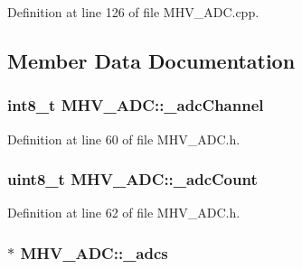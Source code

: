 \-Definition at line 126 of file \-M\-H\-V\-\_\-\-A\-D\-C.\-cpp.



\subsection{\-Member \-Data \-Documentation}
\hypertarget{class_m_h_v___a_d_c_ac37e4bbff5ab56cf804ccbdaa438dab3}{
\subsubsection[{\-\_\-adc\-Channel}]{\setlength{\rightskip}{0pt plus 5cm}int8\-\_\-t {\bf \-M\-H\-V\-\_\-\-A\-D\-C\-::\-\_\-adc\-Channel}}}
\label{class_m_h_v___a_d_c_ac37e4bbff5ab56cf804ccbdaa438dab3}


\-Definition at line 60 of file \-M\-H\-V\-\_\-\-A\-D\-C.\-h.

\hypertarget{class_m_h_v___a_d_c_acfc87dc2be1e01a43b8cb0a1dbfde7e8}{
\subsubsection[{\-\_\-adc\-Count}]{\setlength{\rightskip}{0pt plus 5cm}uint8\-\_\-t {\bf \-M\-H\-V\-\_\-\-A\-D\-C\-::\-\_\-adc\-Count}}}
\label{class_m_h_v___a_d_c_acfc87dc2be1e01a43b8cb0a1dbfde7e8}


\-Definition at line 62 of file \-M\-H\-V\-\_\-\-A\-D\-C.\-h.

\hypertarget{class_m_h_v___a_d_c_a6033f6790dd0a65e88d5a04fc01daaac}{
\subsubsection[{\-\_\-adcs}]{$\ast$ {\bf \-M\-H\-V\-\_\-\-A\-D\-C\-::\-\_\-adcs}}}
\label{class_m_h_v___a_d_c_a6033f6790dd0a65e88d5a04fc01daaac}


